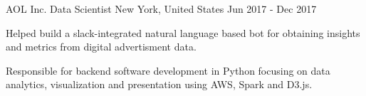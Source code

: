 \begin{cventries}
  \cventry
    {AOL Inc.} %
    {Data Scientist} %
    {New York, United States} %
    {Jun 2017 - Dec 2017} %
    {
      \begin{cvitems} %
        \item {Helped build a slack-integrated natural language based bot for obtaining insights and metrics from digital advertisment data.}
        \item {Responsible for backend software development in Python focusing on data analytics, visualization and presentation using AWS, Spark and D3.js.}
      \end{cvitems}
    }
\end{cventries}
